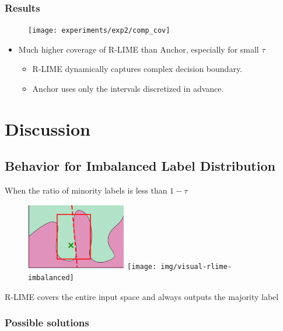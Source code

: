 \documentclass[aspectratio=169]{slide-en}
\begin{document}
\subsubsection{Results}

\begin{frame}{}
  \begin{figure}
    \texttt{[image: experiments/exp2/comp\_cov]}
  \end{figure}
  \begin{itemize}
    \item Much higher coverage of R-LIME than Anchor, especially for small $\tau$
          \smallskip
          \begin{itemize}
            \item R-LIME dynamically captures complex decision boundary.
            \item Anchor uses only the intervals discretized in advance.
          \end{itemize}
  \end{itemize}
\end{frame}

\section{Discussion}

\subsection{Behavior for Imbalanced Label Distribution}

\begin{frame}{}
  When the ratio of minority labels is less than $1-\tau$
  \begin{figure}
    \centering
    \includegraphics[width=0.39\textwidth]{img/visual-rlime3}
    \hspace{1em}
    \texttt{[image: img/visual-rlime-imbalanced]}
  \end{figure}
  R-LIME covers the entire input space and always outputs the majority label
\end{frame}

\subsubsection{Possible solutions}
\end{document}
